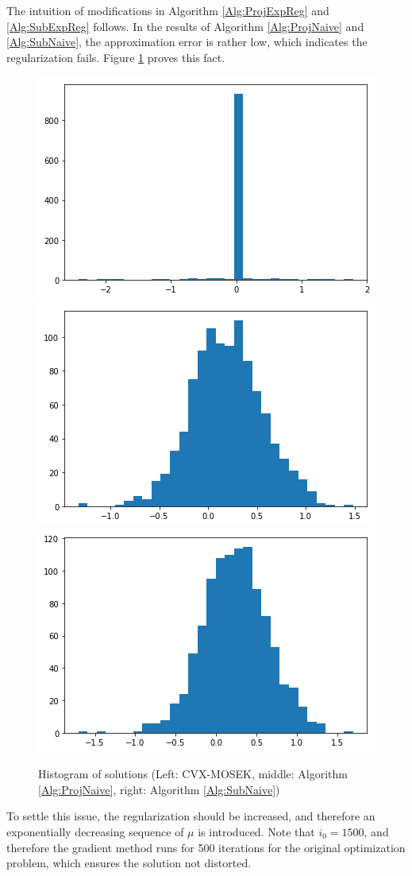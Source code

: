 \documentclass[english]{pkupaper}
\begin{document}
The intuition of modifications in Algorithm \ref{Alg:ProjExpReg} and \ref{Alg:SubExpReg} follows. In the results of Algorithm \ref{Alg:ProjNaive} and \ref{Alg:SubNaive}, the approximation error is rather low, which indicates the regularization fails. Figure \ref{Fig:SparseHist} proves this fact.
\begin{figure}[htbp]
\centering
\includegraphics[width=0.24\pagewidth]{Figure01.png}
\includegraphics[width=0.24\pagewidth]{Figure02.png}
\includegraphics[width=0.24\pagewidth]{Figure03.png}
\caption{Histogram of solutions (Left: CVX-MOSEK, middle: Algorithm \ref{Alg:ProjNaive}, right: Algorithm \ref{Alg:SubNaive})} \label{Fig:SparseHist}
\end{figure}
To settle this issue, the regularization should be increased, and therefore an exponentially decreasing sequence of $\mu$ is introduced. Note that $ i_0 = 1500 $, and therefore the gradient method runs for 500 iterations for the original optimization problem, which ensures the solution not distorted.
\end{document}
